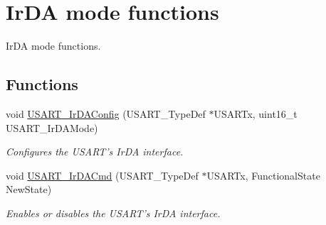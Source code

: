 \hypertarget{group___u_s_a_r_t___group7}{\section{Ir\-D\-A mode functions}
\label{group___u_s_a_r_t___group7}
}


Ir\-D\-A mode functions.  


\subsection*{Functions}
\begin{DoxyCompactItemize}
\item 
void \hyperlink{group___u_s_a_r_t___group7_ga81a0cd36199040bf6d266b57babd678e}{U\-S\-A\-R\-T\-\_\-\-Ir\-D\-A\-Config} (U\-S\-A\-R\-T\-\_\-\-Type\-Def $\ast$U\-S\-A\-R\-Tx, uint16\-\_\-t U\-S\-A\-R\-T\-\_\-\-Ir\-D\-A\-Mode)
\begin{DoxyCompactList}\small\item\em Configures the U\-S\-A\-R\-T's Ir\-D\-A interface. \end{DoxyCompactList}\item 
void \hyperlink{group___u_s_a_r_t___group7_gabff56ebb494fdfadcc6ef4fe9ac8dd24}{U\-S\-A\-R\-T\-\_\-\-Ir\-D\-A\-Cmd} (U\-S\-A\-R\-T\-\_\-\-Type\-Def $\ast$U\-S\-A\-R\-Tx, Functional\-State New\-State)
\begin{DoxyCompactList}\small\item\em Enables or disables the U\-S\-A\-R\-T's Ir\-D\-A interface. \end{DoxyCompactList}\end{DoxyCompactItemize}


